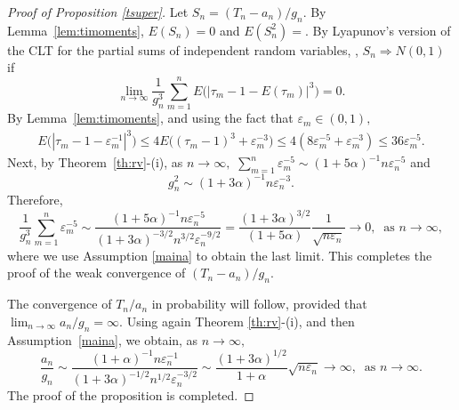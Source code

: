 \documentclass[12pt]{amsart}
\begin{document}
\begin{proof}[Proof of Proposition \ref{tsuper}]
Let $S_n = (T_n -a_n) /g_n$. By Lemma~\ref{lem:timoments},
$E(S_n)=0$ and $E(S_n^2)=$. By  Lyapunov's version of the
CLT for the partial sums of independent random variables, \cite[p.
121]{durrett}, ${S_n}  \Rightarrow N(0,1)$ if
\begin{equation*}
\label{eq:zero}
\lim_{n\to\infty} \frac{1}{g_n^3} \sum_{m=1}^nE \bigl( |\tau_m-1-E (\tau_m)|^{3}\bigr) =0.
\end{equation*}
By Lemma~\ref{lem:timoments}, and using the fact that ${\varepsilon}_m\in (0,1),$
\begin{eqnarray*}
E\bigl(|\tau_m-1-{\varepsilon}_m^{-1}|^3\bigr) \leq
4E\bigl((\tau_m-1)^3+{\varepsilon}_m^{-3}\bigr) \leq 4 (8{\varepsilon}_m^{-5}+{\varepsilon}_m^{-3}) \leq 36 {\varepsilon}_m^{-5}.
\end{eqnarray*}
Next, by Theorem~\ref{th:rv}-(i),  as $n\to\infty,$ $\sum_{m=1}^n {\varepsilon}_m^{-5} \sim (1+5\alpha)^{-1} n{\varepsilon}_n^{-5}$ and
\begin{equation}
\label{eq:gn}
g_n^2  \sim (1+3\alpha)^{-1} n {\varepsilon}_n^{-3}.
\end{equation}
Therefore,
$$ {\frac {\displaystyle {1}}{\displaystyle {g_n^3} }}\sum_{m=1}^n {\varepsilon}_m^{-5} \sim \frac{(1+5\alpha)^{-1} n
{\varepsilon}_n^{-5}}{(1+3\alpha)^{-3/2} n^{3/2} {\varepsilon}_n^{-9/2}}=\frac
{(1+3\alpha)^{3/2}}{(1+5\alpha)} \frac{1}{\sqrt{n {\varepsilon}_n}}\to
0,~\mbox{ as }n\to\infty,$$ where we use Assumption \ref{maina} to
obtain the last limit. This completes the proof of the weak convergence
of $(T_n-a_n)/g_n.$
\par
The convergence of $T_n/a_n$ in probability will follow, provided
that $\lim_{n\to\infty} a_n/g_n =\infty$.
Using again Theorem \ref{th:rv}-(i), and then Assumption~\ref{maina}, we obtain, as $n\to\infty,$
$$ \frac{a_n}{g_n} \sim
\frac{(1+\alpha)^{-1}n{\varepsilon}_n^{-1}}{(1+3\alpha)^{-1/2} n^{1/2}
{\varepsilon}_n^{-3/2}}\sim\frac{(1+3\alpha)^{1/2}}{1+\alpha}
\sqrt{n{\varepsilon}_n}\to \infty,~\mbox{ as }n\to\infty.$$
The proof of the proposition is completed.
\end{proof}
\end{document}
